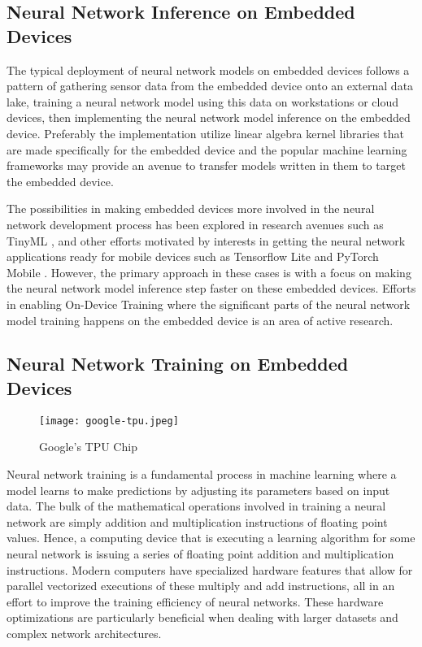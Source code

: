 \subsection{Neural Network Inference on Embedded Devices}

The typical deployment of neural network models on embedded devices follows a pattern of gathering sensor data from the embedded device onto an external data lake, training a neural network model using this data on workstations or cloud devices, then implementing the neural network model inference on the embedded device. Preferably the implementation utilize linear algebra kernel libraries that are made specifically for the embedded device and the popular machine learning frameworks may provide an avenue to transfer models written in them to target the embedded device.

The possibilities in making embedded devices more involved in the neural network development process has been explored in research avenues such as TinyML \cite{tinyml}, and other efforts motivated by interests in getting the neural network applications ready for mobile devices such as Tensorflow Lite \cite{tfl} and PyTorch Mobile \cite{pytorch-mobile}. However, the primary approach in these cases is with a focus on making the neural network model inference step faster on these embedded devices. Efforts in enabling On-Device Training where the significant parts of the neural network model training happens on the embedded device is an area of active research.

\subsection{Neural Network Training on Embedded Devices}

\begin{figure}[h]
	\centering
	\texttt{[image: google-tpu.jpeg]}
	\caption{Google's TPU Chip}
	\label{fig:google-tpu}
\end{figure}

Neural network training is a fundamental process in machine learning where a model learns to make predictions by adjusting its parameters based on input data. The bulk of the mathematical operations involved in training a neural network are simply addition and multiplication instructions of floating point values. Hence, a computing device that is executing a learning algorithm for some neural network is issuing a series of floating point addition and multiplication instructions. Modern computers have specialized hardware features that allow for parallel vectorized executions of these multiply and add instructions, all in an effort to improve the training efficiency of neural networks. These hardware optimizations are particularly beneficial when dealing with larger datasets and complex network architectures.

